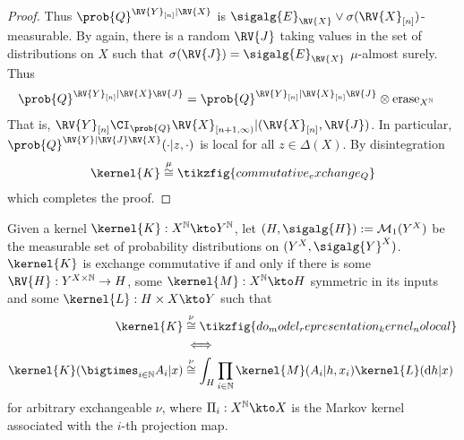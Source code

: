 \begin{proof}
Thus $\prob{Q}^{\RV{Y}_{[n]}|\RV{X}}$ is $\sigalg{E}_{\RV{X}}\vee\sigma(\RV{X}_{[n]})$-measurable. By \citet[Corollary 1.6]{kallenberg_basic_2005} again, there is a random $\RV{J}$ taking values in the set of distributions on $X$ such that $\sigma(\RV{J})=\sigalg{E}_{\RV{X}}$ $\mu$-almost surely. Thus
\begin{align}
    \prob{Q}^{\RV{Y}_{[n]}|\RV{X}\RV{J}} &= \prob{Q}^{\RV{Y}_{[n]}|\RV{X}_{[n]}\RV{J}}\otimes \text{erase}_{X^{\mathbb{N}}}
\end{align}
That is, $\RV{Y}_{[n]}\CI_{\prob{Q}} \RV{X}_{[n+1,\infty)}|(\RV{X}_{[n]},\RV{J})$. In particular, $\prob{Q}^{\RV{Y}|\RV{J}\RV{X}}(\cdot|z,\cdot)$ is local for all $z\in \Delta(X)$. By disintegration
\begin{align}
    \kernel{K} \overset{\mu}{\cong} \tikzfig{commutative_exchange_Q}
\end{align}
which completes the proof.
\end{proof}

\begin{theorem}\label{th:ciid_rep_kernel_nolocal}
Given a kernel $\kernel{K}:X^{\mathbb{N}}\kto Y^{\mathbb{N}}$, let $(H,\sigalg{H}):=\mathcal{M}_1(Y^X)$ be the measurable set of probability distributions on $(Y^X,\sigalg{Y}^X)$. $\kernel{K}$ is exchange commutative if and only if there is some $\RV{H}:Y^{X\times\mathbb{N}}\to H$, some $\kernel{M}:X^{\mathbb{N}}\kto H$ symmetric in its inputs and some $\kernel{L}:H\times X\kto Y$ such that
\begin{align}
    \kernel{K} &\overset{\nu}{\cong} \tikzfig{do_model_representation_kernel_nolocal}\\
    &\iff\\
    \kernel{K}(\bigtimes_{i\in\mathbb{N}}A_i|x) &\overset{\nu}{\cong} \int_H \prod_{i\in\mathbb{N}} \kernel{M}(A_i|h,x_i)\kernel{L}(\mathrm{d}h|x)
\end{align}
for arbitrary exchangeable $\nu$, where $\Pi_i:X^{\mathbb{N}}\kto X$ is the Markov kernel associated with the $i$-th projection map.
\end{theorem}


